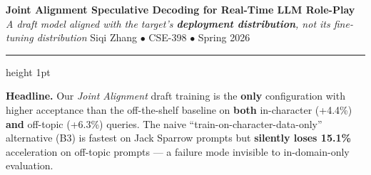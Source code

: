 \documentclass[9pt]{extarticle}
\begin{document}
\begin{center}
  {\LARGE\bfseries\color{primary} Joint Alignment Speculative Decoding for Real-Time LLM Role-Play}\\[0.05em]
  {\footnotesize\itshape\color{darkgray} A draft model aligned with the target's \textbf{deployment distribution}, not its fine-tuning distribution}\quad
  {\footnotesize Siqi Zhang $\bullet$ CSE-398 $\bullet$ Spring 2026}
\end{center}
\vspace{-0.6em}
{\color{primary}\hrule height 1pt}
\vspace{0.1em}

\begin{herobluebox}
\small\textbf{Headline.} Our \emph{Joint Alignment} draft training is the \textbf{only} configuration with higher acceptance than the off-the-shelf baseline on \textbf{both} in-character (+4.4\%) \textbf{and} off-topic (+6.3\%) queries. The naive ``train-on-character-data-only'' alternative (B3) is fastest on Jack Sparrow prompts but \textbf{silently loses 15.1\%} acceleration on off-topic prompts --- a failure mode invisible to in-domain-only evaluation.
\end{herobluebox}
\end{document}

